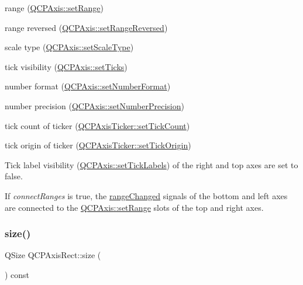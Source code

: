 \begin{DoxyItemize}
\item range (\mbox{\hyperlink{class_q_c_p_axis_aebdfea5d44c3a0ad2b4700cd4d25b641}{Q\+C\+P\+Axis\+::set\+Range}}) \item range reversed (\mbox{\hyperlink{class_q_c_p_axis_a2172fdb196b1a0dc3f40992fcad8e9e1}{Q\+C\+P\+Axis\+::set\+Range\+Reversed}}) \item scale type (\mbox{\hyperlink{class_q_c_p_axis_adef29cae617af4f519f6c40d1a866ca6}{Q\+C\+P\+Axis\+::set\+Scale\+Type}}) \item tick visibility (\mbox{\hyperlink{class_q_c_p_axis_ac891409315bc379e3b1abdb162c1a011}{Q\+C\+P\+Axis\+::set\+Ticks}}) \item number format (\mbox{\hyperlink{class_q_c_p_axis_ae585a54dc2aac662e90a2ca82f002590}{Q\+C\+P\+Axis\+::set\+Number\+Format}}) \item number precision (\mbox{\hyperlink{class_q_c_p_axis_a21dc8023ad7500382ad9574b48137e63}{Q\+C\+P\+Axis\+::set\+Number\+Precision}}) \item tick count of ticker (\mbox{\hyperlink{class_q_c_p_axis_ticker_a47752abba8293e6dc18491501ae34008}{Q\+C\+P\+Axis\+Ticker\+::set\+Tick\+Count}}) \item tick origin of ticker (\mbox{\hyperlink{class_q_c_p_axis_ticker_ab509c7e500293bf66a8409f0d7c23943}{Q\+C\+P\+Axis\+Ticker\+::set\+Tick\+Origin}})\end{DoxyItemize}
Tick label visibility (\mbox{\hyperlink{class_q_c_p_axis_a04ba16e1f6f78d70f938519576ed32c8}{Q\+C\+P\+Axis\+::set\+Tick\+Labels}}) of the right and top axes are set to false.

If {\itshape connect\+Ranges} is true, the \mbox{\hyperlink{class_q_c_p_axis_a0894084e4c16a1736534c4095746f910}{range\+Changed}} signals of the bottom and left axes are connected to the \mbox{\hyperlink{class_q_c_p_axis_aebdfea5d44c3a0ad2b4700cd4d25b641}{Q\+C\+P\+Axis\+::set\+Range}} slots of the top and right axes. \mbox{\label{class_q_c_p_axis_rect_a7a8289346eb612f422c704f8b75cf479}} 
\subsubsection{\texorpdfstring{size()}{size()}}
{\footnotesize\ttfamily Q\+Size Q\+C\+P\+Axis\+Rect\+::size (\begin{DoxyParamCaption}{ }\end{DoxyParamCaption}) const\hspace{0.3cm}{\ttfamily [inline]}}

